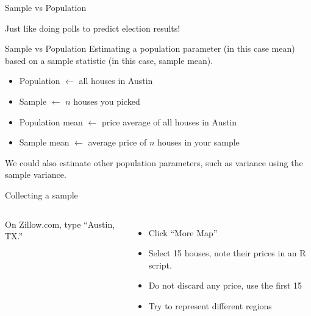 \documentclass{beamer}\usepackage[]{graphicx}\usepackage[]{color}
\begin{document}
\begin{darkframes}
\begin{frame}[label=lists]{Sample vs Population}
   		
		Just like doing polls to predict election results!
		
    \end{frame}    



    \begin{frame}[label=lists]{Sample vs Population}
    	Estimating a \alert{population parameter} (in this case mean) based on a \alert{sample statistic} (in this case, sample mean).
		
		\begin{itemize}
   			\item Population $\leftarrow$ all houses in Austin
			\item Sample $\leftarrow$  $n$ houses you picked
			\item Population mean $\leftarrow$ price average of all houses in Austin
			\item Sample mean $\leftarrow$ average price of $n$ houses in your sample 			
   		\end{itemize}
		
    	We could also estimate other population parameters, such as variance using the sample variance.
		
    \end{frame}  
 

    \begin{frame}[label=lists]{Collecting a sample}
    
    \begin{columns}[onlytextwidth]
        	On Zillow.com, type ``Austin, TX.'' 
        	\begin{itemize}
   				\item Click ``More Map''
   				\item Select 15 houses, note their prices in an R script. 
   				\item Do not discard any price, use the first 15
   				\item Try to represent different regions
			\end{itemize}
        
         
        	

\end{columns}
\end{frame}
\end{darkframes}
\end{document}
